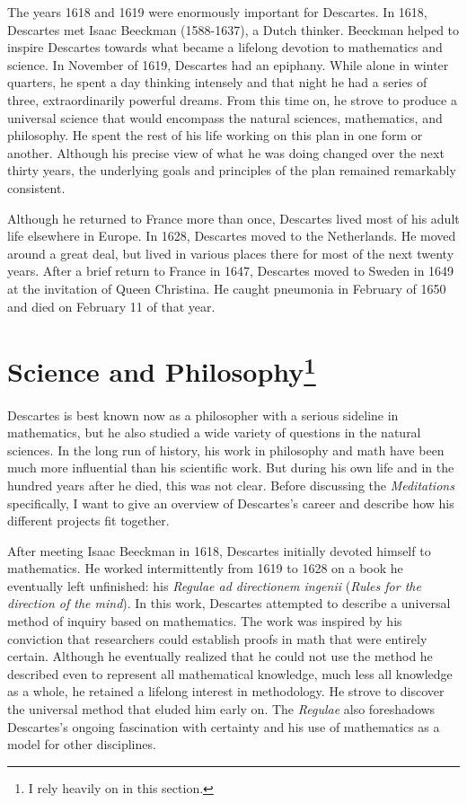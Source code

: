 The years 1618 and 1619 were enormously important for Descartes. In 1618, Descartes met Isaac Beeckman (1588-1637), a Dutch thinker. Beeckman helped to inspire Descartes towards what became a lifelong devotion to mathematics and science. In November of 1619, Descartes had an epiphany. While alone in winter quarters, he spent a day thinking intensely and that night he had a series of three, extraordinarily powerful dreams. From this time on, he strove to produce a universal science that would encompass the natural sciences, mathematics, and philosophy. He spent the rest of his life working on this plan in one form or another. Although his precise view of what he was doing changed over the next thirty years, the underlying goals and principles of the plan remained remarkably consistent.

Although he returned to France more than once, Descartes lived most of his adult life elsewhere in Europe. In 1628, Descartes moved to the Netherlands. He moved around a great deal, but lived in various places there for most of the next twenty years. After a brief return to France in 1647, Descartes moved to Sweden in 1649 at the invitation of Queen Christina. He caught pneumonia in February of 1650 and died on February 11 of that year.

\section*{Science and Philosophy\footnote{I rely heavily on \cite{gaukroger2011} in this section.}}

Descartes is best known now as a philosopher with a serious sideline in mathematics, but he also studied a wide variety of questions in the natural sciences. In the long run of history, his work in philosophy and math have been much more influential than his scientific work. But during his own life and in the hundred years after he died, this was not clear. Before discussing the \textit{Meditations} specifically, I want to give an overview of Descartes's career and describe how his different projects fit together.

After meeting Isaac Beeckman in 1618, Descartes initially devoted himself to mathematics. He worked intermittently from 1619 to 1628 on a book he eventually left unfinished: his \textit{Regulae ad directionem ingenii} (\textit{Rules for the direction of the mind}). In this work, Descartes attempted to describe a universal method of inquiry based on mathematics. The work was inspired by his conviction that researchers could establish proofs in math that were entirely certain. Although he eventually realized that he could not use the method he described even to represent all mathematical knowledge, much less all knowledge as a whole, he retained a lifelong interest in methodology. He strove to discover the universal method that eluded him early on. The \textit{Regulae} also foreshadows Descartes's ongoing fascination with certainty and his use of mathematics as a model for other disciplines.

